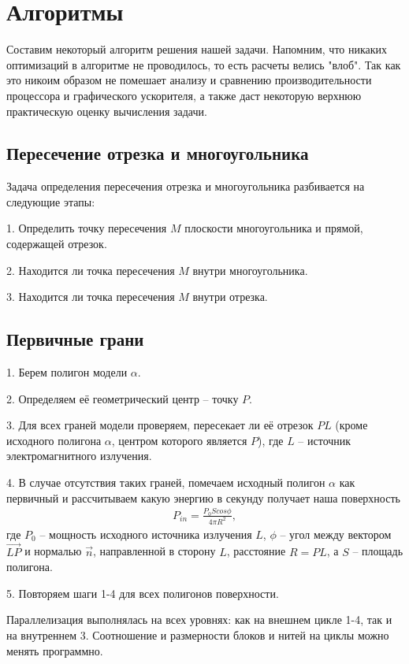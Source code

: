 \newpage
\section*{Алгоритмы} 

Составим некоторый алгоритм решения нашей задачи. Напомним, что никаких оптимизаций в алгоритме не проводилось, то есть расчеты велись "влоб". Так как это никоим образом не помешает анализу и сравнению производительности процессора и графического ускорителя, а также даст некоторую верхнюю практическую оценку вычисления задачи. 

\subsection*{Пересечение отрезка и многоугольника}

Задача определения пересечения отрезка и многоугольника разбивается на следующие этапы:

1. Определить точку пересечения $ M $ плоскости многоугольника и прямой, содержащей отрезок.

2. Находится ли точка пересечения $ M $ внутри многоугольника.

3. Находится ли точка пересечения $ M $ внутри отрезка.


\subsection*{Первичные грани}

1. Берем полигон модели $\alpha$.

2. Определяем её геометрический центр -- точку $P$.

3. Для всех граней модели проверяем, пересекает ли её отрезок $PL$ (кроме исходного полигона $\alpha$, центром которого является $P$), где $L$ -- источник электромагнитного излучения.

4. В случае отсутствия таких граней, помечаем исходный полигон $\alpha$ как первичный и рассчитываем какую энергию в секунду получает наша поверхность
\begin{gather}
  P_{in} = \frac{P_0 S cos\phi}{4 \pi R^2},
\end{gather}
где $P_0$ -- мощность исходного источника излучения $L$, $\phi$ -- угол между вектором $\vec {LP}$ и нормалью $\vec n$, направленной в сторону $L$, расстояние $R = PL$, а $S$ -- площадь полигона.

5. Повторяем шаги 1-4 для всех полигонов поверхности.

Параллелизация выполнялась на всех уровнях: как на внешнем цикле 1-4, так и на внутреннем 3. Соотношение и размерности блоков и нитей на циклы можно менять программно. 

